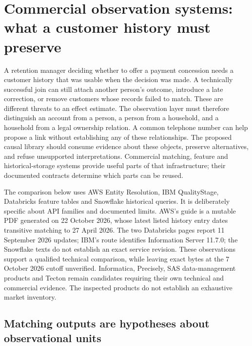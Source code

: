 \section{Commercial observation systems: what a customer history must preserve}
\label{exec22:obs-scope}

A retention manager deciding whether to offer a payment concession needs a customer
history that was usable when the decision was made. A technically successful join
can still attach another person's outcome, introduce a late correction, or remove
customers whose records failed to match. These are different threats to an effect
estimate. The observation layer must therefore distinguish an account from a
person, a person from a household, and a household from a legal ownership relation.
A common telephone number can help propose a link without establishing any of
these relationships. The proposed causal library should consume evidence about
these objects, preserve alternatives, and refuse unsupported interpretations.
Commercial matching, feature and historical-storage systems provide useful parts
of that infrastructure; their documented contracts determine which parts can be
reused.

The comparison below uses AWS Entity Resolution, IBM QualityStage, Databricks
feature tables and Snowflake historical queries. It is deliberately specific about
API families and documented limits. AWS's guide is a mutable PDF generated on
22 October 2026, whose latest listed history entry dates transitive matching to
27 April 2026. The two Databricks pages report 11 September 2026 updates; IBM's
route identifies Information Server 11.7.0; the Snowflake texts do not establish an
exact service revision. These observations support a qualified technical
comparison, while leaving exact bytes at the 7 October 2026 cutoff unverified.
Informatica, Precisely, SAS data-management products and Tecton remain candidates
requiring their own technical and commercial evidence. The inspected products do
not establish an exhaustive market inventory.

\subsection{Matching outputs are hypotheses about observational units}
\label{exec22:obs-linkage}

